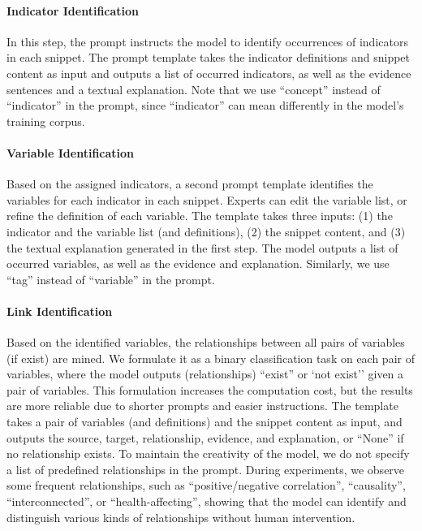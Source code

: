 \paragraph{Indicator Identification} 
In this step, the prompt instructs the model to identify occurrences of indicators in each snippet. The prompt template takes the indicator definitions and snippet content as input and outputs a list of occurred indicators, as well as the evidence sentences and a textual explanation. Note that we use ``concept'' instead of ``indicator'' in the prompt, since ``indicator'' can mean differently in the model's training corpus.  

\paragraph{Variable Identification} Based on the assigned indicators, a second prompt template identifies the variables for each indicator in each snippet. Experts can edit the variable list, or refine the definition of each variable. 
The template takes three inputs:
(1) the indicator and the variable list (and definitions),
(2) the snippet content, and
(3) the textual explanation generated in the first step.
 The model outputs a list of occurred variables, as well as the evidence and explanation. Similarly, we use ``tag'' instead of ``variable'' in the prompt. 

\paragraph{Link Identification} Based on the identified variables, the relationships between all pairs of variables (if exist) are mined. We formulate it as a binary classification task on each pair of variables, where the model outputs (relationships) ``exist'' or `not exist''  given a pair of variables. This formulation increases the computation cost, but the results are more reliable due to shorter prompts and easier instructions. The template takes a pair of variables (and definitions) and the snippet content as input, and outputs the source, target, relationship, evidence, and explanation, or ``None'' if no relationship exists. To maintain the creativity of the model, we do not specify a list of predefined relationships in the prompt. During experiments, we observe some frequent relationships, such as ``positive/negative correlation'', ``causality'', ``interconnected'', or ``health-affecting'', showing that the model can identify and distinguish various kinds of relationships without human intervention.

